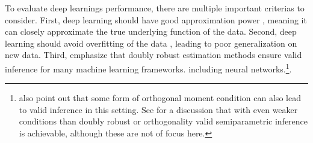 To evaluate deep learnings performance, there are multiple important criterias to consider.
First, deep learning should have good approximation power \citep{belloni2017program}, meaning it can closely approximate the true underlying function of the data.
Second, deep learning should avoid overfitting of the data \citep{belloni2017program}, leading to poor generalization on new data.
Third, \citet{belloni2017program} emphasize that doubly robust estimation methods ensure valid inference for many machine learning frameworks. including neural networks.\footnote[4]{\citet{belloni2017program} also point out that some form of orthogonal moment condition can also lead to valid inference in this setting. See \citet{DeepLearningIndividual2021} for a discussion that with even weaker conditions than doubly robust or orthogonality valid semiparametric inference is achievable, although these are not of focus here.}.




